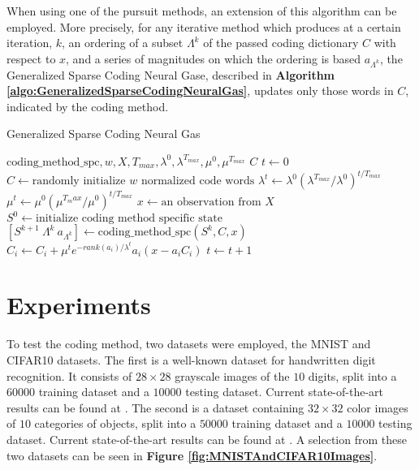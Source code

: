 \documentclass[runningheads,a4paper]{llncs}
\newcommand{\hctimes}[2]{{#1}\!\times\!{#2}}
\newcommand{\hcrange}[2]{\overline{{#1}\colon\!\!{#2}}}
\begin{document}
When using one of the pursuit methods, an extension of this algorithm can be employed. More precisely, for any iterative method which produces at a certain iteration, $k$, an ordering of a subset $\Lambda^k$ of the passed coding dictionary $C$ with respect to $x$, and a series of magnitudes on which the ordering is based $a_{\Lambda^k}$, the Generalized Sparse Coding Neural Gase, described in \textbf{Algorithm \ref{algo:GeneralizedSparseCodingNeuralGas}}, updates only those words in $C$, indicated by the coding method.

\begin{algorithm}
\caption{Generalized Sparse Coding Neural Gas}
\label{algo:GeneralizedSparseCodingNeuralGas}
\begin{algorithmic}
\Require $\text{coding\_method\_spc},w,X,T_{max},\lambda^0,\lambda^{T_{max}},\mu^0,\mu^{T_{max}}$
\Ensure $C$
\State $t \gets 0$
\State $C \gets \text{randomly initialize $w$ normalized code words}$
\State $\lambda^t \gets \lambda^0 (\lambda^{T_{max}} / \lambda^0)^{t / T_{max}}$
\State $\mu^t \gets \mu^0 (\mu^{T_max} / \mu^0)^{t / T_{max}}$
\State $x \gets \text{an observation from $X$}$
\State $S^0 \gets \text{initialize coding method specific state}$
\For {$k = \hcrange{0}{k}$}
\State $[S^{k+1}~\Lambda^k~a_{\Lambda^k}] \gets \text{coding\_method\_spc}(S^k,C,x)$
\State $C_i \gets C_i + \mu^t e^{-rank(a_i) / \lambda^t} a_i (x - a_i C_i)$
\EndFor
\EndFor
\State $t \gets t + 1$
\EndWhile
\end{algorithmic}
\end{algorithm}

\section{Experiments}

To test the coding method, two datasets were employed, the MNIST \cite{lecun-01a} and CIFAR10 \cite{tiny-images} datasets. The first is a well-known dataset for handwritten digit recognition. It consists of $\hctimes{28}{28}$ grayscale images of the $10$ digits, split into a $60000$ training dataset and a $10000$ testing dataset. Current state-of-the-art results can be found at \cite{mnist-results}. The second is a dataset containing $\hctimes{32}{32}$ color images of $10$ categories of objects, split into a $50000$ training dataset and a $10000$ testing dataset. Current state-of-the-art results can be found at \cite{cifar10-results}. A selection from these two datasets can be seen in \textbf{Figure \ref{fig:MNISTAndCIFAR10Images}}.
\end{document}
